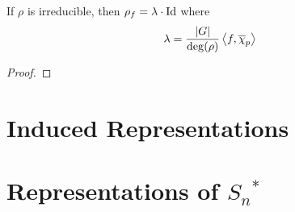 \documentclass{article}
\begin{document}
\begin{proposition}
    If $\rho$ is irreducible, then $\rho_f = \lambda \cdot \mathrm{Id}$ where
    \[
        \lambda = \frac{\left|G\right|}{\deg(\rho)} \left\langle f, \overline{\chi}_p \right\rangle
    \]
\end{proposition}

\begin{proof}
    
\end{proof}

\section{Induced Representations}

\section{Representations of $S_n$$^{\ast}$}
\end{document}
